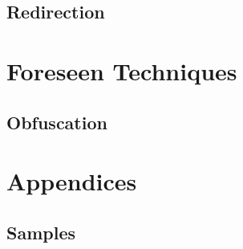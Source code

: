 \documentclass[11pt,fleqn,oneside]{book} %
\begin{document}
\chapter{Redirection} \label{ch:known-redirection}



\part{Foreseen Techniques}
\chapter{Obfuscation} \label{ch:foreseen-obfuscation}


\renewcommand{\thechapter}{\Alph{chapter}}
\renewcommand{\thesection}{\Alph{chapter}.\Roman{section}}
\renewcommand{\thesubsection}{\Alph{chapter}.\Roman{section}.\alph{subsection}}
\part{Appendices}
\chapter{Samples}

\newpage\printbibliography[title = {Resources}]
\end{document}

